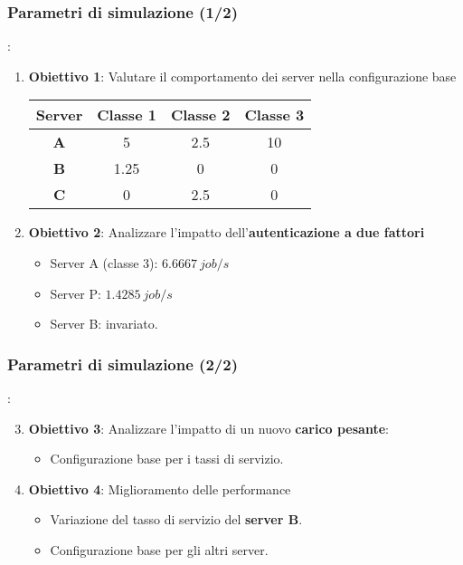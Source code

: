 \subsubsection{Parametri di simulazione (1/2)}
\begin{frame}{\subsecname: \subsubsecname}
    \begin{enumerate}
        \item \textbf{Obiettivo 1}: Valutare il comportamento dei server nella configurazione base
        \begin{table}[H]
        \centering
        \begin{tabular}{cccc}
            \toprule
            \textbf{Server} & \textbf{Classe 1} & \textbf{Classe 2} & \textbf{Classe 3} \\
            \midrule
            \textbf{A} & 5 & 2.5 & 10 \\
            \textbf{B} & 1.25 & 0 & 0 \\
            \textbf{C} & 0 & 2.5 & 0 \\
            \bottomrule
        \end{tabular}
        \label{tab:service-rates-vanilla}
    \end{table}
    \vspace{0.2cm}
        \item \textbf{Obiettivo 2}: Analizzare l'impatto dell'\textbf{autenticazione a due fattori}
        \begin{itemize}
            \item Server A (classe 3): $6.6667~job/s$
            \item Server P: $1.4285~job/s$
            \item Server B: invariato.
        \end{itemize}
    \end{enumerate}
\end{frame}

\subsubsection{Parametri di simulazione (2/2)}
\begin{frame}{\subsecname: \subsubsecname}    
\begin{enumerate}
        \setcounter{enumi}{2}
        \item \textbf{Obiettivo 3}: Analizzare l'impatto di un nuovo \textbf{carico pesante}:
        \begin{itemize}
            \item Configurazione base per i tassi di servizio.
        \end{itemize}
        \item \textbf{Obiettivo 4}: Miglioramento delle performance
        \begin{itemize}
            \item Variazione del tasso di servizio del \textbf{server B}.
            \item Configurazione base per gli altri server.
        \end{itemize}
    \end{enumerate}
\end{frame}


